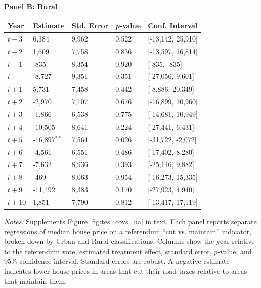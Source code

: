 \begin{table}[htbp]
\begin{threeparttable}
    \centering
    \textbf{Panel B: Rural} \\[4pt]
    \begin{tabularx}{\textwidth}{l*{4}{X}}
    \hline
    \textbf{Year} & \textbf{Estimate} & \textbf{Std. Error} & \textbf{\textit{p}-value} & \textbf{Conf. Interval} \\
    \hline
    $t - 3$  & 6,384  & 9,962  & 0.522 & [-13,142, 25,910] \\
    $t - 2$  & 1,609  & 7,758  & 0.836 & [-13,597, 16,814] \\
    $t - 1$  & -835   & 8,354  & 0.920 & [-835, -835] \\
    $t$  & -8,727 & 9,351  & 0.351 & [-27,056, 9,601] \\
    $t + 1$  & 5,731  & 7,458  & 0.442 & [-8,886, 20,349] \\
    $t + 2$  & -2,970 & 7,107  & 0.676 & [-16,899, 10,960] \\
    $t + 3$  & -1,866 & 6,538  & 0.775 & [-14,681, 10,949] \\
    $t + 4$  & -10,505 & 8,641 & 0.224 & [-27,441, 6,431] \\
    $t + 5$  & -16,897$^{**}$ & 7,564 & 0.026 & [-31,722, -2,072] \\
    $t + 6$  & -4,561 & 6,551  & 0.486 & [-17,402, 8,280] \\
    $t + 7$  & -7,632 & 8,936  & 0.393 & [-25,146, 9,882] \\
    $t + 8$  & -469   & 8,063  & 0.954 & [-16,273, 15,335] \\
    $t + 9$  & -11,492 & 8,383 & 0.170 & [-27,923, 4,940] \\
    $t + 10$ & 1,851  & 7,790  & 0.812 & [-13,417, 17,119] \\
    \hline
    \end{tabularx}
    
    \begin{tablenotes}[flushleft]
    \small
    \item \textit{Notes:} Supplements Figure \ref{fig:tes_covs_ua} in text. Each panel reports separate regressions of median house price on a referendum “cut vs. maintain” indicator, broken down by Urban and Rural classifications. Columns show the year relative to the referendum vote, estimated treatment effect, standard error, \(p\)-value, and 95\% confidence interval. Standard errors are robust. A negative estimate indicates lower house prices in areas that cut their road taxes relative to areas that maintain them.
    \end{tablenotes}
    \end{threeparttable}
\end{table}

